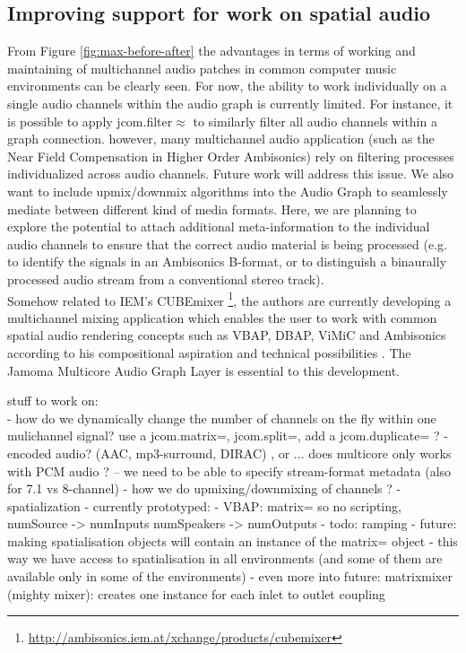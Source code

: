 \documentclass[twoside,a4paper]{article}
\begin{document}



\subsection{Improving support for work on spatial audio} %


From Figure \ref{fig:max-before-after} the advantages in terms of working and maintaining of multichannel audio patches in common computer music environments can be clearly seen.
For now, the ability to work individually on a single audio channels within the audio graph is currently limited.
For instance, it is possible to apply jcom.filter$\approx$ to similarly filter all audio channels within a graph connection. however, many multichannel audio application (such as the Near Field Compensation in Higher Order Ambisonics) rely on filtering processes individualized across audio channels. Future work will address this issue.
We also want to include upmix/downmix algorithms into the Audio Graph to seamlessly mediate between different kind of media formats. Here, we are planning to explore the potential to attach additional meta-information to the individual audio channels to ensure that the correct audio material is being processed (e.g. to identify the signals in an Ambisonics B-format, or to distinguish a binaurally processed audio stream from a conventional stereo track). \\
Somehow related to IEM's CUBEmixer \footnote{\url{http://ambisonics.iem.at/xchange/products/cubemixer}}, the authors are currently developing a multichannel mixing application which enables the user to work with common spatial audio rendering concepts such as VBAP, DBAP, ViMiC and Ambisonics according to his compositional aspiration and technical possibilities \cite{Peters:2009}. The Jamoma Multicore Audio Graph Layer is essential to this development.


 stuff to work on:\\
- how do we dynamically change the number of channels on the fly within one mulichannel signal? use a jcom.matrix=, jcom.split=, add a jcom.duplicate= ? 
- encoded audio? (AAC, mp3-surround, DIRAC) , or ... does multicore only works with PCM audio ? -- we need to be able to specify stream-format metadata (also for 7.1 vs 8-channel)
- how we do upmixing/downmixing of channels ? 
    - spatialization - currently prototyped:
        - VBAP: matrix= so no scripting, 
            numSource -> numInputs
            numSpeakers -> numOutputs
        - todo: ramping
        - future: making spatialisation objects will contain an instance of the matrix= object
        - this way we have access to spatialisation in all environments
            (and some of them are available only in some of the environments)
        - even more into future: matrixmixer (mighty mixer): creates one instance for each inlet to outlet coupling
                                    
\end{document}
